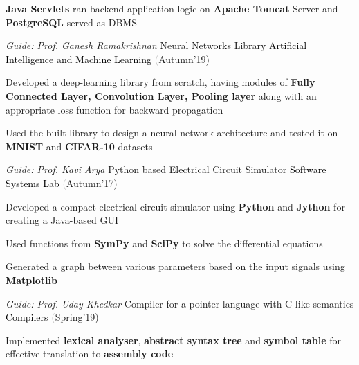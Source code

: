 \begin{cventries}
{\begin{cvitems}
        \item \textbf{Java Servlets} ran backend application logic on \textbf{Apache Tomcat} Server and \textbf{PostgreSQL} served as DBMS \vspace{-1mm}
      \end{cvitems}
    }
  \cventry
    {\textit{Guide: Prof. Ganesh Ramakrishnan}}
    {Neural Networks Library}
    {\textcolor{black} {Artificial Intelligence and Machine Learning}}
    {\fontsize{9pt}{1em} \textcolor{darkgray}(Autumn'19)}
    {
      \begin{cvitems}
        \item Developed a deep-learning library from scratch, having modules of \textbf{Fully Connected Layer, Convolution Layer,
        Pooling layer} along with an appropriate loss function for backward propagation\vspace{0.25mm}
        \item Used the built library to design a neural network architecture and tested it on \textbf{MNIST} and \textbf{CIFAR-10} datasets \vspace{-1mm}
      \end{cvitems}
    }
  \cventry
    {\textit{Guide: Prof. Kavi Arya}}
    {Python based Electrical Circuit Simulator}
    {\textcolor{black} {Software Systems Lab}}
    {\fontsize{9pt}{1em} \textcolor{darkgray}(Autumn'17)}
    {
      \begin{cvitems}
        \item Developed a compact electrical circuit simulator using \textbf{Python} and \textbf{Jython} for creating a Java-based GUI \vspace{0.25mm}
        \item Used functions from \textbf{SymPy} and \textbf{SciPy} to solve the differential equations \vspace{0.25mm}
        \item Generated a graph between various parameters based on the input signals using \textbf{Matplotlib} \vspace{-1mm}
      \end{cvitems}
    }
  \cventry
    {\textit{Guide: Prof. Uday Khedkar}}
    {Compiler for a pointer language with C like semantics}
    {\textcolor{black} {Compilers}}
    {\fontsize{9pt}{1em} \textcolor{darkgray}(Spring'19)}
    {
      \begin{cvitems}
        \item Implemented \textbf{lexical analyser}, \textbf{abstract syntax tree} and \textbf{symbol table} for effective translation to \textbf{assembly code} \vspace{0.25mm}

\end{cvitems}}
\end{cventries}
